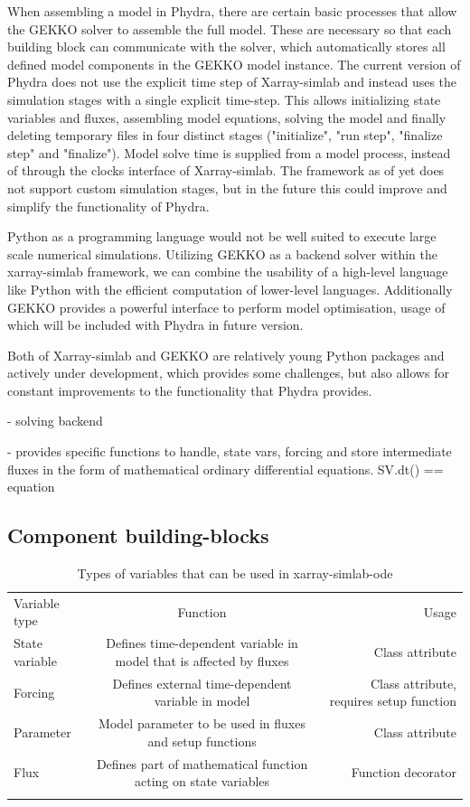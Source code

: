 \documentclass[journal abbreviation, manuscript]{copernicus}
\begin{document}
When assembling a model in Phydra, there are certain basic processes that allow the GEKKO solver to assemble the full model. These are necessary so that each building block can communicate with the solver, which automatically stores all defined model components in the GEKKO model instance. The current version of Phydra does not use the explicit time step of Xarray-simlab and instead uses the simulation stages with a single explicit time-step. This allows initializing state variables and fluxes, assembling model equations, solving the model and finally deleting temporary files in four distinct stages ("initialize", "run step", "finalize step" and "finalize"). Model solve time is supplied from a model process, instead of through the clocks interface of Xarray-simlab. The framework as of yet does not support custom simulation stages, but in the future this could improve and simplify the functionality of Phydra.

Python as a programming language would not be well suited to execute large scale numerical simulations.
Utilizing GEKKO as a backend solver within the xarray-simlab framework, we can combine the usability of a high-level language like Python with the efficient computation of lower-level languages. Additionally GEKKO provides a powerful interface to perform model optimisation, usage of which will be included with Phydra in future version. 

Both of Xarray-simlab and GEKKO are relatively young  Python packages and actively under development, which provides some challenges, but also allows for constant improvements to the functionality that Phydra provides.


- solving backend

- provides specific functions to handle, state vars, forcing and store intermediate fluxes in the form of mathematical ordinary differential equations. SV.dt() == equation


\subsection{Component building-blocks}

%
\begin{table}[t]
\caption{Types of variables that can be used in xarray-simlab-ode}
\begin{tabular}{l c r}
\tophline
Variable type &  Function & Usage \\
%
\middlehline
State variable & Defines time-dependent variable in model that is affected by fluxes & Class attribute \\
Forcing & Defines external time-dependent variable in model & Class attribute, requires setup function \\
Parameter & Model parameter to be used in fluxes and setup functions & Class attribute \\
Flux & Defines part of mathematical function acting on state variables & Function decorator \\
%
\bottomhline
\end{tabular}
\belowtable{} %
\end{table}
%
\end{document}
